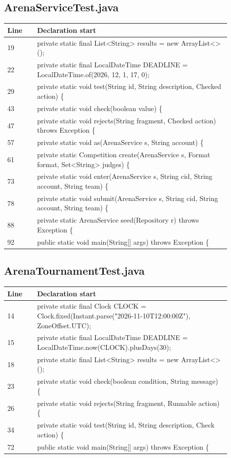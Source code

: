 \subsection*{ArenaServiceTest.java}
\begin{longtable}{p{0.12\linewidth}p{0.78\linewidth}}\toprule Line & Declaration start\\\midrule\endhead
19 & private static final List<String> results = new ArrayList<>();\\
22 & private static final LocalDateTime DEADLINE = LocalDateTime.of(2026, 12, 1, 17, 0);\\
29 & private static void test(String id, String description, Checked action) \{\\
43 & private static void check(boolean value) \{\\
47 & private static void rejects(String fragment, Checked action) throws Exception \{\\
57 & private static void as(ArenaService s, String account) \{\\
61 & private static Competition create(ArenaService s, Format format, Set<String> judges) \{\\
73 & private static void enter(ArenaService s, String cid, String account, String team) \{\\
78 & private static void submit(ArenaService s, String cid, String account, String team) \{\\
88 & private static ArenaService seed(Repository r) throws Exception \{\\
92 & public static void main(String[] args) throws Exception \{\\
\bottomrule\end{longtable}
\subsection*{ArenaTournamentTest.java}
\begin{longtable}{p{0.12\linewidth}p{0.78\linewidth}}\toprule Line & Declaration start\\\midrule\endhead
14 & private static final Clock CLOCK = Clock.fixed(Instant.parse("2026-11-10T12:00:00Z"), ZoneOffset.UTC);\\
15 & private static final LocalDateTime DEADLINE = LocalDateTime.now(CLOCK).plusDays(30);\\
18 & private static final List<String> results = new ArrayList<>();\\
23 & private static void check(boolean condition, String message) \{\\
26 & private static void rejects(String fragment, Runnable action) \{\\
34 & private static void test(String id, String description, Check action) \{\\
72 & public static void main(String[] args) throws Exception \{\\
\bottomrule\end{longtable}
